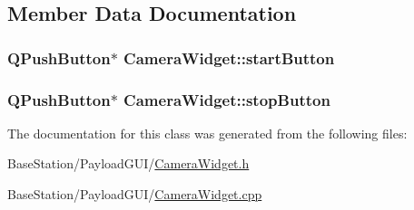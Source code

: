 \subsection{Member Data Documentation}
\hypertarget{classCameraWidget_a543f4c84a21b9e5e8ee536632f0cff74}{
\subsubsection[{start\-Button}]{\setlength{\rightskip}{0pt plus 5cm}Q\-Push\-Button$\ast$ Camera\-Widget\-::start\-Button\hspace{0.3cm}{\ttfamily [private]}}}\label{classCameraWidget_a543f4c84a21b9e5e8ee536632f0cff74}
\hypertarget{classCameraWidget_a93e74216fec1ab83f8e05efa54b631a1}{
\subsubsection[{stop\-Button}]{\setlength{\rightskip}{0pt plus 5cm}Q\-Push\-Button$\ast$ Camera\-Widget\-::stop\-Button\hspace{0.3cm}{\ttfamily [private]}}}\label{classCameraWidget_a93e74216fec1ab83f8e05efa54b631a1}


The documentation for this class was generated from the following files\-:\begin{DoxyCompactItemize}
\item 
Base\-Station/\-Payload\-G\-U\-I/\hyperlink{CameraWidget_8h}{Camera\-Widget.\-h}\item 
Base\-Station/\-Payload\-G\-U\-I/\hyperlink{CameraWidget_8cpp}{Camera\-Widget.\-cpp}\end{DoxyCompactItemize}
